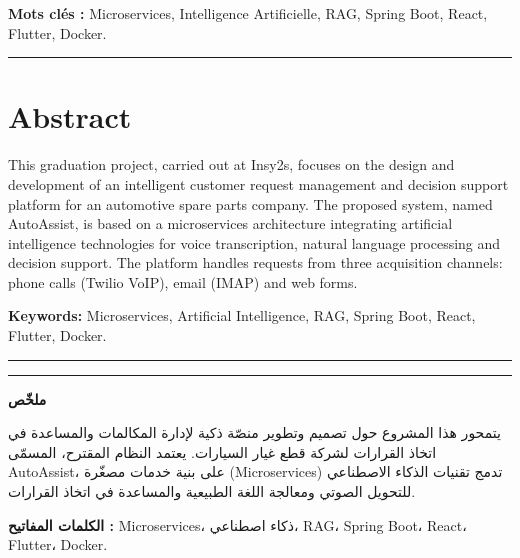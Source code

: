 \documentclass[a4paper,12pt]{report}
\begin{document}
\vspace{0.5cm}
\noindent\textbf{Mots cl\'{e}s :} Microservices, Intelligence Artificielle, RAG, Spring Boot, React, Flutter, Docker.

\noindent\rule{\textwidth}{0.4pt}

\vspace{0.8cm}

\section*{Abstract}

\noindent This graduation project, carried out at Insy2s, focuses on the design and development of an intelligent customer request management and decision support platform for an automotive spare parts company. The proposed system, named AutoAssist, is based on a microservices architecture integrating artificial intelligence technologies for voice transcription, natural language processing and decision support. The platform handles requests from three acquisition channels: phone calls (Twilio VoIP), email (IMAP) and web forms.

\vspace{0.5cm}
\noindent\textbf{Keywords:} Microservices, Artificial Intelligence, RAG, Spring Boot, React, Flutter, Docker.

\noindent\rule{\textwidth}{0.4pt}

\newpage
\thispagestyle{empty}

\noindent\rule{\textwidth}{0.4pt}

\vspace{0.5cm}

\begin{Arabic}
\begin{center}
{\Large \textbf{ملخّص}}
\end{center}

\vspace{0.5cm}

يتمحور هذا المشروع حول تصميم وتطوير منصّة ذكية لإدارة المكالمات والمساعدة في اتخاذ القرارات لشركة قطع غيار السيارات. يعتمد النظام المقترح، المسمّى AutoAssist، على بنية خدمات مصغّرة (Microservices) تدمج تقنيات الذكاء الاصطناعي للتحويل الصوتي ومعالجة اللغة الطبيعية والمساعدة في اتخاذ القرارات.

\vspace{0.5cm}

\textbf{الكلمات المفاتيح :} Microservices، ذكاء اصطناعي، RAG، Spring Boot، React، Flutter، Docker.
\end{Arabic}
\end{document}
